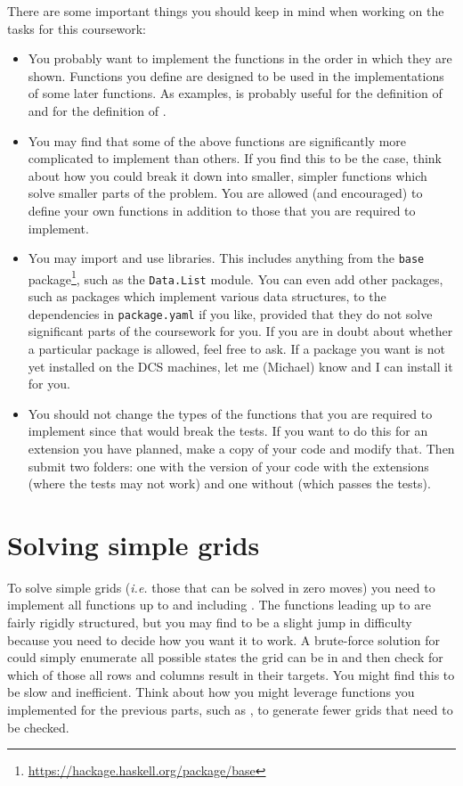 There are some important things you should keep in mind when working on the tasks for this coursework:
\begin{itemize}
	\item You probably want to implement the functions in the order in which they are shown. Functions you define are designed to be used in the implementations of some later functions. As examples,  is probably useful for the definition of  and  for the definition of .
	\item You may find that some of the above functions are significantly more complicated to implement than others. If you find this to be the case, think about how you could break it down into smaller, simpler functions which solve smaller parts of the problem. You are allowed (and encouraged) to define your own functions in addition to those that you are required to implement.
	\item You may import and use libraries. This includes anything from the \texttt{\small base} package\footnote{\url{https://hackage.haskell.org/package/base}}, such as the \texttt{\small Data.List} module. You can even add other packages, such as packages which implement various data structures, to the dependencies in \texttt{\small package.yaml} if you like, provided that they do not solve significant parts of the coursework for you. If you are in doubt about whether a particular package is allowed, feel free to ask. If a package you want is not yet installed on the DCS machines, let me (Michael) know and I can install it for you.
	\item You should not change the types of the functions that you are required to implement since that would break the tests. If you want to do this for an extension you have planned, make a copy of your code and modify that. Then submit two folders: one with the version of your code with the extensions (where the tests may not work) and one without (which passes the tests). 
\end{itemize}


\section{Solving simple grids}

To solve simple grids (\emph{i.e.} those that can be solved in zero moves) you need to implement all functions up to and including . The functions leading up to  are fairly rigidly structured, but you may find  to be a slight jump in difficulty because you need to decide how you want it to work. A brute-force solution for  could simply enumerate all possible states the grid can be in and then check for which of those all rows and columns result in their targets. You might find this to be slow and inefficient. Think about how you might leverage functions you implemented for the previous parts, such as , to generate fewer grids that need to be checked.

